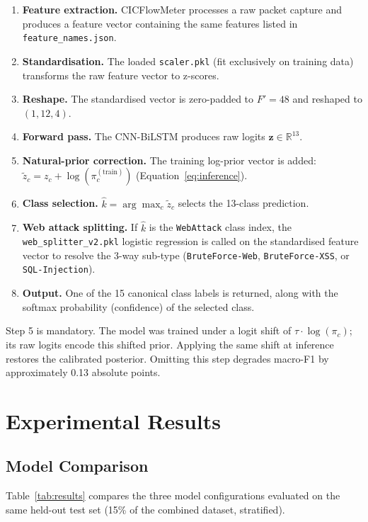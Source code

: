\documentclass[12pt]{article}
\theoremstyle{plain}
\begin{document}
\begin{enumerate}
    \item \textbf{Feature extraction.} CICFlowMeter processes a raw packet capture and produces a feature vector containing the same features listed in \texttt{feature\_names.json}.
    \item \textbf{Standardisation.} The loaded \texttt{scaler.pkl} (fit exclusively on training data) transforms the raw feature vector to z-scores.
    \item \textbf{Reshape.} The standardised vector is zero-padded to $F' = 48$ and reshaped to $(1, 12, 4)$.
    \item \textbf{Forward pass.} The CNN-BiLSTM produces raw logits $\mathbf{z} \in \mathbb{R}^{13}$.
    \item \textbf{Natural-prior correction.} The training log-prior vector is added: $\tilde{z}_c = z_c + \log(\pi_c^{(\text{train})})$ (Equation~\ref{eq:inference}).
    \item \textbf{Class selection.} $\hat{k} = \arg\max_c \tilde{z}_c$ selects the 13-class prediction.
    \item \textbf{Web attack splitting.} If $\hat{k}$ is the \texttt{WebAttack} class index, the \texttt{web\_splitter\_v2.pkl} logistic regression is called on the standardised feature vector to resolve the 3-way sub-type (\texttt{BruteForce-Web}, \texttt{BruteForce-XSS}, or \texttt{SQL-Injection}).
    \item \textbf{Output.} One of the 15 canonical class labels is returned, along with the softmax probability (confidence) of the selected class.
\end{enumerate}

Step 5 is mandatory. The model was trained under a logit shift of $\tau \cdot \log(\pi_c)$; its raw logits encode this shifted prior. Applying the same shift at inference restores the calibrated posterior. Omitting this step degrades macro-F1 by approximately 0.13 absolute points.

\newpage

\section{Experimental Results}
\label{sec:results}

\subsection{Model Comparison}

Table~\ref{tab:results} compares the three model configurations evaluated on the same held-out test set (15\% of the combined dataset, stratified).
\end{document}
